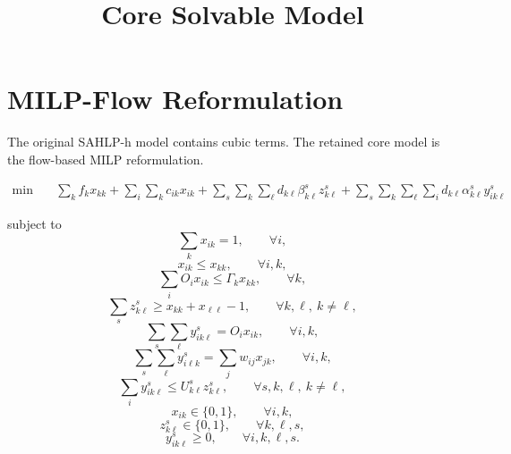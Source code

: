 \documentclass[11pt,a4paper]{article}
\title{Core Solvable Model}
\author{}
\date{}
\begin{document}
\maketitle

\section*{MILP-Flow Reformulation}
The original SAHLP-h model contains cubic terms. The retained core model is the
flow-based MILP reformulation.

\begin{equation}
\begin{aligned}
\min \quad
& \sum_k f_k x_{kk}
+ \sum_i \sum_k c_{ik} x_{ik}
+ \sum_s \sum_k \sum_\ell d_{k\ell} \beta_{k\ell}^s z_{k\ell}^s
+ \sum_s \sum_k \sum_\ell \sum_i d_{k\ell} \alpha_{k\ell}^s y_{ik\ell}^s
\end{aligned}
\tag{M1}
\end{equation}

subject to
\begin{equation}
\sum_k x_{ik} = 1,
\qquad \forall i,
\tag{M2}
\end{equation}
\begin{equation}
x_{ik} \le x_{kk},
\qquad \forall i,k,
\tag{M3}
\end{equation}
\begin{equation}
\sum_i O_i x_{ik} \le \Gamma_k x_{kk},
\qquad \forall k,
\tag{M4}
\end{equation}
\begin{equation}
\sum_s z_{k\ell}^s \ge x_{kk} + x_{\ell\ell} - 1,
\qquad \forall k,\ell,\ k \neq \ell,
\tag{M5}
\end{equation}
\begin{equation}
\sum_s \sum_\ell y_{ik\ell}^s = O_i x_{ik},
\qquad \forall i,k,
\tag{M6}
\end{equation}
\begin{equation}
\sum_s \sum_\ell y_{i\ell k}^s = \sum_j w_{ij} x_{jk},
\qquad \forall i,k,
\tag{M7}
\end{equation}
\begin{equation}
\sum_i y_{ik\ell}^s \le U_{k\ell}^s z_{k\ell}^s,
\qquad \forall s,k,\ell,\ k \neq \ell,
\tag{M8}
\end{equation}
\begin{equation}
x_{ik} \in \{0,1\},
\qquad \forall i,k,
\tag{M9}
\end{equation}
\begin{equation}
z_{k\ell}^s \in \{0,1\},
\qquad \forall k,\ell,s,
\tag{M10}
\end{equation}
\begin{equation}
y_{ik\ell}^s \ge 0,
\qquad \forall i,k,\ell,s.
\tag{M11}
\end{equation}
\end{document}
